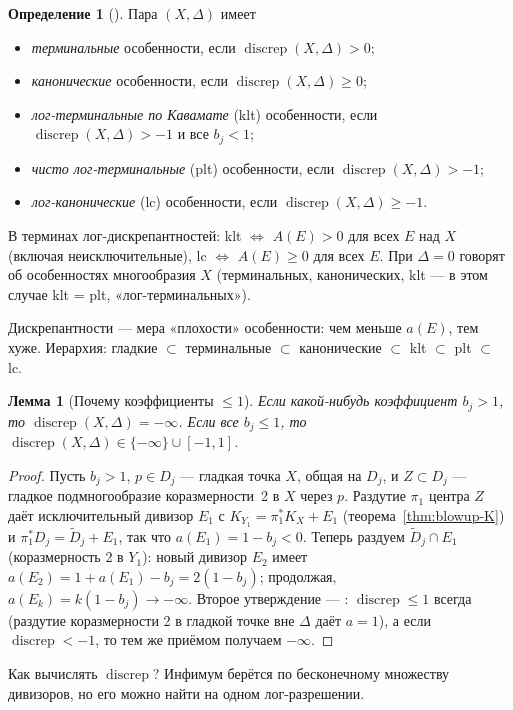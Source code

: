 \documentclass[11pt,a4paper]{article}
\theoremstyle{plain}
\newtheorem{lemma}[theorem]{Лемма}
\theoremstyle{definition}
\newtheorem{definition}[theorem]{Определение}
\theoremstyle{remark}
\DeclareMathOperator{\discrep}{discrep}
\begin{document}
\begin{definition}[{\cite[2.34]{KM}}]\label{def:klt}
Пара $(X,\Delta)$ имеет
\begin{itemize}
\item \emph{терминальные} особенности, если $\discrep(X,\Delta)>0$;
\item \emph{канонические} особенности, если $\discrep(X,\Delta)\ge0$;
\item \emph{лог-терминальные по Кавамате} (klt) особенности, если $\discrep(X,\Delta)>-1$ и все
$b_j<1$;
\item \emph{чисто лог-терминальные} (plt) особенности, если $\discrep(X,\Delta)>-1$;
\item \emph{лог-канонические} (lc) особенности, если $\discrep(X,\Delta)\ge-1$.
\end{itemize}
В терминах лог-дискрепантностей: klt $\iff$ $A(E)>0$ для всех $E$ над $X$ (включая
неисключительные), lc $\iff$ $A(E)\ge0$ для всех $E$. При $\Delta=0$ говорят об особенностях
многообразия $X$ (терминальных, канонических, klt --- в этом случае klt = plt, «лог-терминальных»).
\end{definition}

Дискрепантности --- мера «плохости» особенности: чем меньше $a(E)$, тем хуже. Иерархия:
гладкие $\subset$ терминальные $\subset$ канонические $\subset$ klt $\subset$ plt $\subset$ lc.

\begin{lemma}[Почему коэффициенты $\le1$]\label{lem:coeff-le-1}
Если какой-нибудь коэффициент $b_j>1$, то $\discrep(X,\Delta)=-\infty$. Если все $b_j\le1$, то
$\discrep(X,\Delta)\in\{-\infty\}\cup[-1,1]$.
\end{lemma}
\begin{proof}
Пусть $b_j>1$, $p\in D_j$ --- гладкая точка $X$, общая на $D_j$, и $Z\subset D_j$ --- гладкое
подмногообразие коразмерности~2 в $X$ через $p$. Раздутие $\pi_1$ центра $Z$ даёт исключительный
дивизор $E_1$ с $K_{Y_1}=\pi_1^*K_X+E_1$ (теорема~\ref{thm:blowup-K}) и $\pi_1^*D_j=\tilde D_j+E_1$,
так что $a(E_1)=1-b_j<0$. Теперь раздуем $\tilde D_j\cap E_1$ (коразмерность 2 в $Y_1$): новый
дивизор $E_2$ имеет $a(E_2)=1+a(E_1)-b_j=2(1-b_j)$; продолжая, $a(E_k)=k(1-b_j)\to-\infty$.
Второе утверждение --- \cite[2.31]{KM}: $\discrep\le1$ всегда (раздутие коразмерности 2 в гладкой
точке вне $\Delta$ даёт $a=1$), а если $\discrep<-1$, то тем же приёмом получаем $-\infty$.
\end{proof}

Как вычислять $\discrep$? Инфимум берётся по бесконечному множеству дивизоров, но его можно найти
на одном лог-разрешении.
\end{document}
